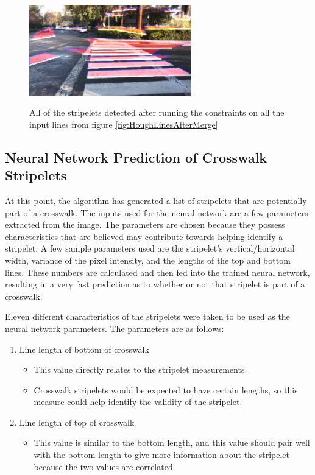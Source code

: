 \documentclass[12pt]{ucthesis}
\newcommand{\captionfonts}{\small\bf\ssp}
\begin{document}
\begin{figure}[h!]
\begin{center}
\includegraphics[width=7cm]{UnculledStripelets.png}
\captionfonts
\caption[All detected stripelets]{All of the stripelets detected after running the constraints on all the input lines from figure \ref{fig:HoughLinesAfterMerge}}
\label{fig:UnculledStripelets}
\end{center}
\end{figure}

\subsection{Neural Network Prediction of Crosswalk Stripelets}


At this point, the algorithm has generated a list of stripelets that are potentially part of a crosswalk. The inputs used for the neural network are a few parameters extracted from the image. The parameters are chosen because they possess characteristics that are believed may contribute towards helping identify a stripelet. A few sample parameters used are the stripelet's vertical/horizontal width, variance of the pixel intensity, and the lengths of the top and bottom lines. These numbers are calculated and then fed into the trained neural network, resulting in a very fast prediction as to whether or not that stripelet is part of a crosswalk.


Eleven different characteristics of the stripelets were taken to be used as the neural network parameters. The parameters are as follows:

\begin{enumerate}
   \item Line length of bottom of crosswalk
   \begin{itemize}
     \item This value directly relates to the stripelet measurements.
     \item Crosswalk stripelets would be expected to have certain lengths, so this measure could help identify the validity of the stripelet.
   \end{itemize}
   \item Line length of top of crosswalk
   \begin{itemize}
     \item This value is similar to the bottom length, and this value should pair well with the bottom length to give more information about the stripelet because the two values are correlated.
   \end{itemize}
\end{enumerate}
\end{document}
